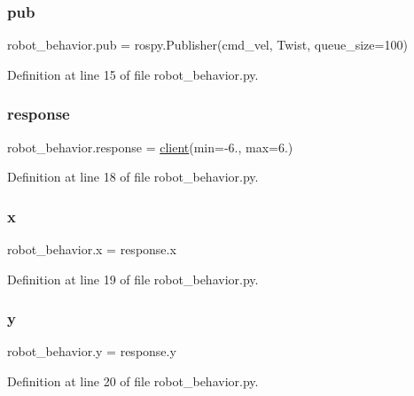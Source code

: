 \mbox{\label{namespacerobot__behavior_afec75724c8502be2b13af611548e8ed5}} 
\subsubsection{\texorpdfstring{pub}{pub}}
{\footnotesize\ttfamily robot\+\_\+behavior.\+pub = rospy.\+Publisher(\textquotesingle{}cmd\+\_\+vel\textquotesingle{}, Twist, queue\+\_\+size=100)}



Definition at line 15 of file robot\+\_\+behavior.\+py.

\mbox{\label{namespacerobot__behavior_ad24b97ca826242e79a54d1ce7324de27}} 
\subsubsection{\texorpdfstring{response}{response}}
{\footnotesize\ttfamily robot\+\_\+behavior.\+response = \hyperlink{namespacerobot__behavior_afe11a3139022cf72f927c89b3b7c8364}{client}(min=-\/6., max=6.)}



Definition at line 18 of file robot\+\_\+behavior.\+py.

\mbox{\label{namespacerobot__behavior_ab7c31583eff517c7c9ebcd4e2d498d8b}} 
\subsubsection{\texorpdfstring{x}{x}}
{\footnotesize\ttfamily robot\+\_\+behavior.\+x = response.\+x}



Definition at line 19 of file robot\+\_\+behavior.\+py.

\mbox{\label{namespacerobot__behavior_aa41f1e9f708b4470e60d2bffdd1d7433}} 
\subsubsection{\texorpdfstring{y}{y}}
{\footnotesize\ttfamily robot\+\_\+behavior.\+y = response.\+y}



Definition at line 20 of file robot\+\_\+behavior.\+py.

